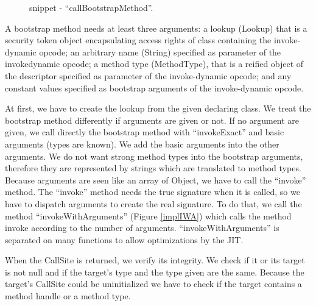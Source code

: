 \documentclass{sig-alternate}
\begin{document}
      \begin{figure}[!h]
        \centering \vspace{-1.5em}
        \caption{snippet - ``callBootstrapMethod''.}\vspace{-1em}
        \label{implBSM}
      \end{figure}

      A bootstrap method needs at least three arguments:
      a lookup (Lookup) that is a security token object encapsulating access rights of class containing the invoke-dynamic opcode;
      an arbitrary name (String) specified as parameter of the invokedynamic opcode;
      a method type (MethodType), that is a reified object of the descriptor specified as parameter of the invoke-dynamic opcode;
      and any constant values specified as bootstrap arguments of the invoke-dynamic opcode.

      At first, we have to create the lookup from the given  declaring class.
      We treat the bootstrap method differently if arguments are given or not.
      If no argument are given, we call directly the bootstrap method
      with ``invokeExact'' and basic arguments (types are known).
      We add the basic arguments into the other arguments.
      We do not want strong method types into the bootstrap arguments,
      therefore they are represented by strings which are translated to method types.
      Because arguments are seen like an array of Object,
      we have to call the ``invoke'' method.
      The ``invoke'' method needs the true signature when it is called,
      so we have to dispatch arguments to create the real signature.
      To do that, we call the method ``invokeWithArguments'' (Figure \ref{implIWA})
      which calls the method invoke according to the number of arguments.
      ``invokeWithArguments'' is separated on many functions to allow optimizations by the JIT.


      When the CallSite is returned, we verify its integrity.
      We check if it or its target is not null and if the target's type and the type given are the same.
      Because the target's CallSite could be uninitialized we have to check if the target contains a method handle or a method type.
\end{document}
